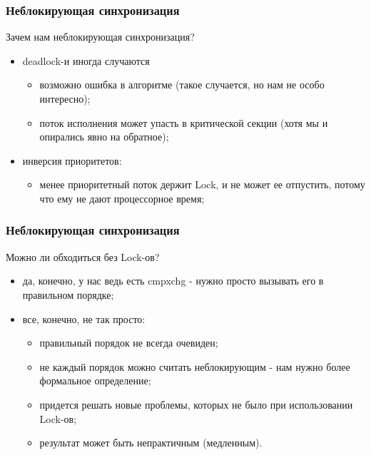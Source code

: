\begin{frame}
\frametitle{Неблокирующая синхронизация}

Зачем нам неблокирующая синхронизация?
\begin{itemize}
  \item deadlock-и иногда случаются
    \begin{itemize}
      \item возможно ошибка в алгоритме (такое случается, но нам не особо интересно);
      \item поток исполнения может упасть в критической секции (хотя мы и опирались явно на обратное);
    \end{itemize}
  \item инверсия приоритетов:
    \begin{itemize}
      \item менее приоритетный поток держит Lock, и не может ее отпустить, потому что ему не дают процессорное время;
    \end{itemize}
\end{itemize}
\end{frame}

\begin{frame}
\frametitle{Неблокирующая синхронизация}

Можно ли обходиться без Lock-ов?
\begin{itemize}
  \item<1> да, конечно, у нас ведь есть cmpxchg - нужно просто вызывать его в правильном порядке;
  \item<2> все, конечно, не так просто:
    \begin{itemize}
      \item правильный порядок не всегда очевиден;
      \item не каждый порядок можно считать неблокирующим - нам нужно более формальное определение;
      \item придется решать новые проблемы, которых не было при использовании Lock-ов;
      \item результат может быть непрактичным (медленным).
    \end{itemize}
\end{itemize}
\end{frame}

